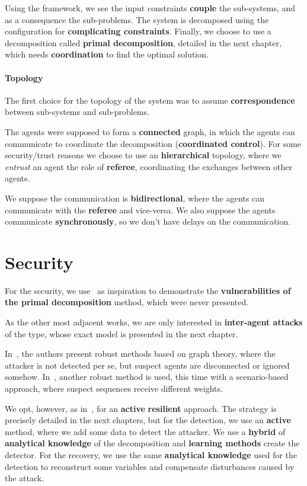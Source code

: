 \documentclass[../main.tex]{subfiles}
\begin{document}
Using the framework, we see the input constraints \textbf{couple} the sub-systems, and as a consequence the sub-problems.
The system is decomposed using the configuration for \textbf{complicating constraints}. Finally, we choose to use a decomposition called \textbf{primal decomposition}, detailed in the next chapter, which needs \textbf{coordination} to find the optimal solution.

\paragraph*{Topology}\label{sec:decomposition_chosen}
The first choice for the topology of the system was to assume \textbf{correspondence} between sub-systems and sub-problems.

The agents were supposed to form a \textbf{connected} graph, in which the agents can communicate to coordinate the decomposition (\textbf{coordinated control}).
For some security/trust reasons we choose to use an \textbf{hierarchical} topology, where we \emph{entrust} an agent the role of \textbf{referee}, coordinating the exchanges between other agents.

We suppose the communication is \textbf{bidirectional}, where the agents can communicate with the \textbf{referee} and vice-versa.
We also suppose the agents communicate \textbf{synchronously}, so we don't have delays on the communication.

\section*{Security}
For the security, we use~\cite{VelardeEtAl2017b,ChanfreutEtAl2018} as inspiration to demonstrate the \textbf{vulnerabilities of the primal decomposition} method, which were never presented.

As the other most adjacent works, we are only interested in \textbf{inter-agent attacks} of the \textbf{\fdi{}} type, whose exact model is presented in the next chapter.

In~\cite{VelardeEtAl2017b,VelardeEtAl2018}, the authors present robust methods based on graph theory, where the attacker is not detected per se, but suspect agents are disconnected or ignored somehow.
In~\cite{VelardeEtAl2017a,MaestreEtAl2021}, another robust method is used, this time with a scenario-based approach, where suspect sequences receive different weights.

We opt, however, as in~\cite{AnandutaEtAl2018,AnandutaEtAl2019,AnandutaEtAl2020},
for an \textbf{active} \textbf{resilient} approach.
The strategy is precisely detailed in the next chapters, but for the detection, we use an \textbf{active} method, where we add some data to detect the attacker.
We use a \textbf{hybrid} of \textbf{analytical knowledge} of the decomposition and \textbf{learning methods} create the detector.
For the recovery, we use the same \textbf{analytical knowledge} used for the detection to reconstruct some variables and compensate disturbances caused by the attack.
\end{document}
